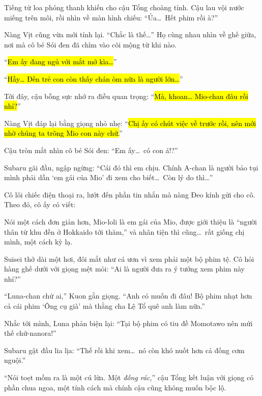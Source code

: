 \documentclass[../main.tex]{subfiles}
\begin{document}
Tiếng từ loa phóng thanh khiến cho cậu Tổng choàng tỉnh. Cậu lau vội nước miếng trên môi, rồi nhìn về màn hình chiếu: ``Ủa\dots\ Hết phim rồi à?''

Nàng Vịt cũng vừa mới tỉnh lại. ``Chắc là thế\dots'' Họ cùng nhau nhìn về ghế giữa, nơi mà cô bé Sói đen đã chìm vào cõi mộng từ khi nào.

``\hl{Em ấy đang ngủ với mắt mở kìa\dots}''

``\hl{Hầy\dots{} Đến trẻ con còn thấy chán òm nữa là người lớn\dots}''

Tới đây, cậu bỗng sực nhớ ra điều quan trọng: ``\hl{Mà, khoan\dots{} Mio-chan đâu rồi nhỉ?}''

Nàng Vịt đáp lại bằng giọng nhỏ nhẹ: ``\hl{Chị ấy có chút việc về trước rồi, nên mới nhờ chúng ta trông Mio con này chứ.}''

Cậu tròn mắt nhìn cô bé Sói đen: ``Em ấy\dots\ có con á!?''

Subaru gãi đầu, ngập ngừng: ``Cái đó thì em chịu. Chính A-chan là người bảo tụi mình phải dẫn `em gái của Mio' đi xem cho biết\dots\ Còn lý do thì\dots''

Cô lôi chiếc điện thoại ra, lướt đến phần tin nhắn mà nàng Đeo kính gửi cho cô. Theo đó, cô ấy có viết:


Nói một cách đơn giản hơn, Mio-loli là em gái của Mio, được giới thiệu là ``người thân từ khu đền ở Hokkaido tới thăm,'' và nhân tiện thì cũng\dots\ rất giống chị mình, một cách kỳ lạ.

Suisei thở dài một hơi, đôi mắt như cá ươn vì xem phải một bộ phim tệ. Cô hỏi hàng ghế dưới với giọng mệt mỏi: ``Ai là người đưa ra ý tưởng xem phim này nhỉ?''

``Luna-chan chứ ai,'' Kuon gằn giọng. ``Anh có muốn đi đâu! Bộ phim nhạt hơn cả cái phim `Ông cụ già' mà thằng cha Lệ Tổ quê anh làm nữa.''

Nhắc tới mình, Luna phản biện lại: ``Tại bộ phim có tiu đề Momotawo nên mứi thế chứ-nanora!''

Subaru gật đầu lia lịa: ``Thế rồi khi xem\dots\ nó còn khó nuốt hơn cả đống cơm nguội.''

``Nói toẹt mồm ra là một cú lừa. Một \emph{đống rác},'' cậu Tổng kết luận với giọng có phần chua ngoa, một tính cách mà chính cậu cũng không muốn bộc lộ.
\end{document}
